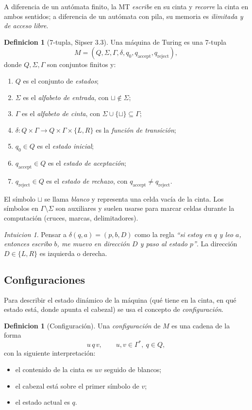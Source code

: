 \documentclass[11pt,a4paper]{article}
\theoremstyle{plain}
\theoremstyle{definition}
\newtheorem{definicion}[teorema]{Definicion}
\theoremstyle{remark}
\newtheorem*{intuicion}{Intuicion}
\newcommand{\qaccept}{q_{\text{accept}}}
\newcommand{\qreject}{q_{\text{reject}}}
\newcommand{\blank}{\sqcup}
\begin{document}
A diferencia de un aut\'omata finito, la MT \emph{escribe} en su cinta y
\emph{recorre} la cinta en ambos sentidos; a diferencia de un aut\'omata
con pila, su memoria es \emph{ilimitada y de acceso libre}.

\begin{definicion}[7-tupla, Sipser 3.3]
\label{def:mt}
Una m\'aquina de Turing es una 7-tupla
\[
  M = (Q, \Sigma, \Gamma, \delta, q_0, \qaccept, \qreject),
\]
donde $Q,\Sigma,\Gamma$ son conjuntos finitos y:
\begin{enumerate}
  \item $Q$ es el conjunto de \emph{estados};
  \item $\Sigma$ es el \emph{alfabeto de entrada}, con $\blank\notin\Sigma$;
  \item $\Gamma$ es el \emph{alfabeto de cinta}, con $\Sigma\cup\{\blank\}\subseteq\Gamma$;
  \item $\delta : Q\times\Gamma \to Q\times\Gamma\times\{L,R\}$ es la
        \emph{funci\'on de transici\'on};
  \item $q_0\in Q$ es el \emph{estado inicial};
  \item $\qaccept\in Q$ es el \emph{estado de aceptaci\'on};
  \item $\qreject\in Q$ es el \emph{estado de rechazo}, con $\qaccept\neq\qreject$.
\end{enumerate}
\end{definicion}

El s\'imbolo $\blank$ se llama \emph{blanco} y representa una celda vac\'ia
de la cinta. Los s\'imbolos en $\Gamma\setminus\Sigma$ son auxiliares y
suelen usarse para marcar celdas durante la computaci\'on (cruces, marcas,
delimitadores).

\begin{intuicion}
Pensar a $\delta(q,a)=(p,b,D)$ como la regla \emph{``si estoy en $q$ y leo
$a$, entonces escribo $b$, me muevo en direcci\'on $D$ y paso al estado
$p$''}. La direcci\'on $D\in\{L,R\}$ es izquierda o derecha.
\end{intuicion}

\subsection{Configuraciones}

Para describir el estado din\'amico de la m\'aquina (qu\'e tiene en la cinta,
en qu\'e estado est\'a, donde apunta el cabezal) se usa el concepto de
\emph{configuraci\'on}.

\begin{definicion}[Configuraci\'on]
\label{def:configuracion}
Una \emph{configuraci\'on} de $M$ es una cadena de la forma
\[
  u\,q\,v,\qquad u,v\in\Gamma^*,\ q\in Q,
\]
con la siguiente interpretaci\'on:
\begin{itemize}
  \item el contenido de la cinta es $uv$ seguido de blancos;
  \item el cabezal est\'a sobre el primer s\'imbolo de $v$;
  \item el estado actual es $q$.
\end{itemize}
\end{definicion}
\end{document}
